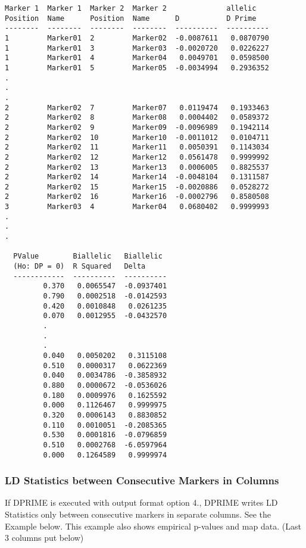 \begin{verbatim}
Marker 1  Marker 1  Marker 2  Marker 2              allelic   
Position  Name      Position  Name      D           D Prime   
--------  --------  --------  --------  ----------  ----------
1         Marker01  2         Marker02  -0.0087611   0.0870790
1         Marker01  3         Marker03  -0.0020720   0.0226227
1         Marker01  4         Marker04   0.0049701   0.0598500
1         Marker01  5         Marker05  -0.0034994   0.2936352
.
.
.
2         Marker02  7         Marker07   0.0119474   0.1933463
2         Marker02  8         Marker08   0.0004402   0.0589372
2         Marker02  9         Marker09  -0.0096989   0.1942114
2         Marker02  10        Marker10  -0.0011012   0.0104711
2         Marker02  11        Marker11   0.0050391   0.1143034
2         Marker02  12        Marker12   0.0561478   0.9999992
2         Marker02  13        Marker13   0.0006005   0.8825537
2         Marker02  14        Marker14  -0.0048104   0.1311587
2         Marker02  15        Marker15  -0.0020886   0.0528272
2         Marker02  16        Marker16  -0.0002796   0.8580508
3         Marker03  4         Marker04   0.0680402   0.9999993
.
.
.

  PValue        Biallelic   Biallelic 
  (Ho: DP = 0)  R Squared   Delta     
  ------------  ----------  ----------
         0.370   0.0065547  -0.0937401
         0.790   0.0002518  -0.0142593
         0.420   0.0010848   0.0261235
         0.070   0.0012955  -0.0432570
         .
         .                            
         .
         0.040   0.0050202   0.3115108
         0.510   0.0000317   0.0622369
         0.040   0.0034786  -0.3858932
         0.880   0.0000672  -0.0536026
         0.180   0.0009976   0.1625592
         0.000   0.1126467   0.9999975
         0.320   0.0006143   0.8830852
         0.110   0.0010051  -0.2085365
         0.530   0.0001816  -0.0796859
         0.510   0.0002768  -6.0597964
         0.000   0.1264589   0.9999974
\end{verbatim}

\subsubsection{LD Statistics between Consecutive Markers in Columns}

If DPRIME is executed with output format option 4., DPRIME writes LD Statistics
only between consecutive markers in separate columns.  See the Example below.
This example also shows empirical p-values and map data. (Last 3 columns put
below)

